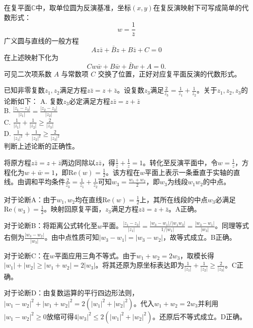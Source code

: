 在复平面$\mathbb{C}$中，取单位圆为反演基准，坐标$(x,y)$在复反演映射下可写成简单的代数形式：
$$w = \frac{1}{\bar{z}}$$
广义圆与直线的一般方程
\[
A z \bar{z} + \bar{B} z + B \bar{z} + C = 0
\]
在上述映射下化为
\[
C w \bar{w} + B \bar{w} + \bar{B} w + A = 0.
\]
可见二次项系数 $A$ 与常数项 $C$ 交换了位置，正好对应复平面反演的代数形式。

\begin{example}
已知非零复数$z_1, z_2$满足方程$z\bar{z} = z + \bar{z}$。设复数$z_3$满足$\frac{2}{z_3} = \frac{1}{z_1} + \frac{1}{z_2}$。关于$z_1, z_2, z_3$的论断如下：
A. 复数$z_3$必定满足方程$z\bar{z} = z + \bar{z}$ \\
B. $\frac{|z_1 - z_3|}{|z_1|} = \frac{|z_2 - z_3|}{|z_2|}$ \\
C. $\frac{1}{|z_1|} + \frac{1}{|z_2|} \ge \frac{2}{|z_3|}$ \\
D. $\frac{1}{|z_1|^2} + \frac{1}{|z_2|^2} \ge \frac{2}{|z_3|^2}$ \\
判断上述论断的正确性。
\end{example}
\begin{solution}
将原方程$z\bar{z} = z + \bar{z}$两边同除以$z\bar{z}$，得$\frac{1}{\bar{z}} + \frac{1}{z} = 1$。转化至反演平面中，令$w = \frac{1}{z}$，方程化为$w + \bar{w} = 1$，即$\text{Re}(w) = \frac{1}{2}$。该方程在$w$平面上表示一条垂直于实轴的直线。由调和平均条件$\frac{2}{z_3} = \frac{1}{z_1} + \frac{1}{z_2}$可知$w_3 = \frac{w_1 + w_2}{2}$，即$w_3$为线段$w_1 w_2$的中点。

对于论断A：由于$w_1, w_2$均在直线$\text{Re}(w) = \frac{1}{2}$上，其所在线段的中点$w_3$必满足$\text{Re}(w_3) = \frac{1}{2}$。映射回原复平面，$z_3$满足方程$z\bar{z} = z + \bar{z}$。A正确。

对于论断B：将距离公式转化至$w$平面。$\frac{|z_1 - z_3|}{|z_1|} = \frac{|w_3 - w_1|/|w_1 w_3|}{1/|w_1|} = \frac{|w_3 - w_1|}{|w_3|}$。同理等式右侧为$\frac{|w_3 - w_2|}{|w_3|}$。由中点性质可知$|w_3 - w_1| = |w_3 - w_2|$，故等式成立。B正确。

对于论断C：在$w$平面应用三角不等式。由于$w_1 + w_2 = 2w_3$，取模长得$|w_1| + |w_2| \ge |w_1 + w_2| = 2|w_3|$。将其还原为原坐标表达即为$\frac{1}{|z_1|} + \frac{1}{|z_2|} \ge \frac{2}{|z_3|}$。C正确。

对于论断D：由复数运算的平行四边形法则，$|w_1 - w_2|^2 + |w_1 + w_2|^2 = 2(|w_1|^2 + |w_2|^2)$。代入$w_1 + w_2 = 2w_3$并利用$|w_1 - w_2|^2 \ge 0$放缩可得$4|w_3|^2 \le 2(|w_1|^2 + |w_2|^2)$。还原后不等式成立。D正确。
\end{solution}

